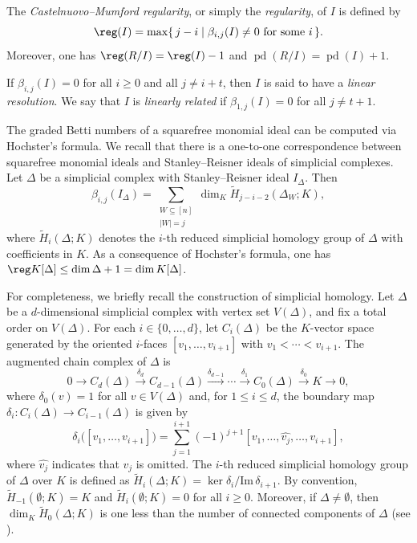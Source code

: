 \documentclass[12pt]{amsart}
\let\to=\rightarrow
\begin{document}
The \emph{Castelnuovo--Mumford regularity}, or simply the \emph{regularity}, of $I$ is defined by
\[
\reg(I) = \max\{\, j - i \mid \beta_{i,j}(I) \neq 0 \text{ for some } i \,\}.
\]
Moreover, one has $\reg(R/I)=\reg(I)-1$ and $\operatorname{pd}(R/I)=\operatorname{pd}(I)+1$.

If $\beta_{i,j}(I) = 0$ for all $i \ge 0$ and all $j \neq i + t$, then $I$ is said to have a \textit{linear resolution}. We say that $I$ is \textit{linearly related} if $\beta_{1,j}(I) = 0$ for all $j \neq t + 1$.

The graded Betti numbers of a squarefree monomial ideal can be computed via Hochster’s formula. We recall that there is a one-to-one correspondence between squarefree monomial ideals and Stanley--Reisner ideals of simplicial complexes. Let $\Delta$ be a simplicial complex with Stanley--Reisner ideal $I_\Delta$. Then
\[
\beta_{i,j}(I_{\Delta}) =
\sum_{\substack{W \subseteq [n] \\ |W| = j}}
\dim_K \widetilde{H}_{j-i-2}(\Delta_W; K),
\]
where $\widetilde{H}_i(\Delta;K)$ denotes the $i$-th reduced simplicial homology group of $\Delta$ with coefficients in $K$. As a consequence of Hochster’s formula, one has $\reg K[\Delta] \le \dim \Delta + 1 = \dim K[\Delta]$.

For completeness, we briefly recall the construction of simplicial homology. Let $\Delta$ be a $d$-dimensional simplicial complex with vertex set $V(\Delta)$, and fix a total order on $V(\Delta)$. For each $i \in \{0,\dots,d\}$, let $C_i(\Delta)$ be the $K$-vector space generated by the oriented $i$-faces $[v_1,\dots,v_{i+1}]$ with $v_1 < \cdots < v_{i+1}$. The augmented chain complex of $\Delta$ is
\[
0 \to C_d(\Delta) \xrightarrow{\delta_d} C_{d-1}(\Delta) \xrightarrow{\delta_{d-1}} \cdots \xrightarrow{\delta_1} C_0(\Delta) \xrightarrow{\delta_0} K \to 0,
\]
where $\delta_0(v)=1$ for all $v \in V(\Delta)$ and, for $1 \le i \le d$, the boundary map $\delta_i : C_i(\Delta) \to C_{i-1}(\Delta)$ is given by
\[
\delta_i \big([v_1,\ldots,v_{i+1}]\big)
=
\sum_{j=1}^{i+1} (-1)^{j+1}
[v_1, \ldots, \hat{v_j}, \ldots, v_{i+1}],
\]
where $\hat{v_j}$ indicates that $v_j$ is omitted. The $i$-th reduced simplicial homology group of $\Delta$ over $K$ is defined as $\widetilde{H}_i(\Delta;K)=\ker \delta_i / \mathrm{Im}\, \delta_{i+1}$. By convention, $\widetilde{H}_{-1}(\emptyset;K)=K$ and $\widetilde{H}_i(\emptyset;K)=0$ for all $i \ge 0$. Moreover, if $\Delta \neq \emptyset$, then $\dim_K \widetilde{H}_0(\Delta;K)$ is one less than the number of connected components of $\Delta$ (see \cite[Chapter 1, Section 7]{MJ}).
\end{document}
